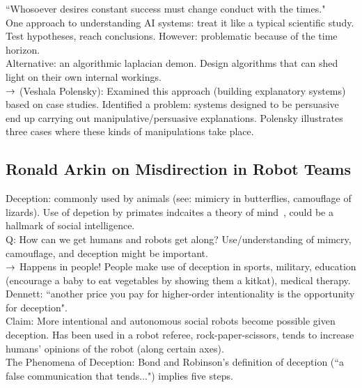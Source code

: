 ``Whosoever desires constant success must change conduct with the times."  \\

One approach to understanding AI systems: treat it like a typical scientific study. Test hypotheses, reach conclusions. However: problematic because of the time horizon.  \\

Alternative: an algorithmic laplacian demon. Design algorithms that can shed light on their own internal workings. \\

$\rightarrow$ (Veshala Polensky): Examined this approach (building explanatory systems) based on case studies. Identified a problem: systems designed to be persuasive end up carrying out manipulative/persuasive explanations. Polensky illustrates three cases where these kinds of manipulations take place.


\spacerule

\subsection{Ronald Arkin on Misdirection in Robot Teams}

Deception: commonly used by animals (see: mimicry in butterflies, camouflage of lizards). Use of depetion by primates indcaites a theory of mind~\cite{byrne1990machiavellian}, could be a hallmark of social intelligence. \\

Q: How can we get humans and robots get along? Use/understanding of mimcry, camouflage, and deception might be important. \\

$\rightarrow$ Happens in people! People make use of deception in sports, military, education (encourage a baby to eat vegetables by showing them a kitkat), medical therapy. \\

Dennett: ``another price you pay for higher-order intentionality is the opportunity for deception". \\

Claim: More intentional and autonomous social robots become possible given deception. Has been used in a robot referee, rock-paper-scissors, tends to increase humans' opinions of the robot (along certain axes). \\

The Phenomena of Deception: Bond and Robinson's definition of deception (``a false communication that tends...") implies five steps. \\

